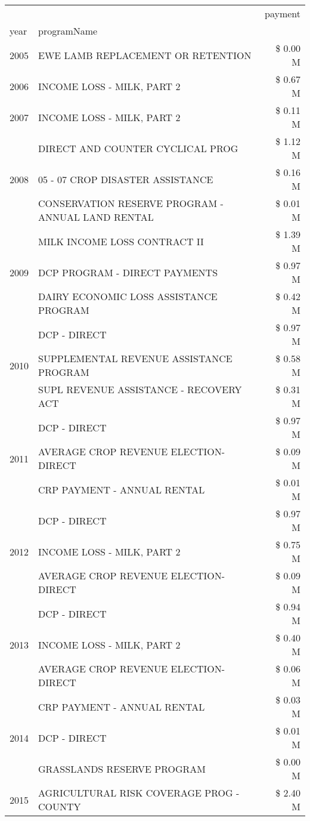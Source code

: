 \begin{tabular}{llr}
\toprule
 &  & payment \\
year & programName &  \\
\midrule
2005 & EWE LAMB REPLACEMENT OR RETENTION & \$ 0.00 M \\
\cline{1-3}
2006 & INCOME LOSS - MILK, PART 2 & \$ 0.67 M \\
\cline{1-3}
2007 & INCOME LOSS - MILK, PART 2 & \$ 0.11 M \\
\cline{1-3}
\multirow[t]{3}{*}{2008} & DIRECT AND COUNTER CYCLICAL PROG & \$ 1.12 M \\
 & 05 - 07 CROP DISASTER ASSISTANCE & \$ 0.16 M \\
 & CONSERVATION RESERVE PROGRAM - ANNUAL LAND RENTAL & \$ 0.01 M \\
\cline{1-3}
\multirow[t]{3}{*}{2009} & MILK INCOME LOSS CONTRACT II & \$ 1.39 M \\
 & DCP PROGRAM - DIRECT PAYMENTS & \$ 0.97 M \\
 & DAIRY ECONOMIC LOSS ASSISTANCE PROGRAM & \$ 0.42 M \\
\cline{1-3}
\multirow[t]{3}{*}{2010} & DCP - DIRECT & \$ 0.97 M \\
 & SUPPLEMENTAL REVENUE ASSISTANCE PROGRAM & \$ 0.58 M \\
 & SUPL REVENUE ASSISTANCE - RECOVERY ACT & \$ 0.31 M \\
\cline{1-3}
\multirow[t]{3}{*}{2011} & DCP - DIRECT & \$ 0.97 M \\
 & AVERAGE CROP REVENUE ELECTION-DIRECT & \$ 0.09 M \\
 & CRP PAYMENT - ANNUAL RENTAL & \$ 0.01 M \\
\cline{1-3}
\multirow[t]{3}{*}{2012} & DCP - DIRECT & \$ 0.97 M \\
 & INCOME LOSS - MILK, PART 2 & \$ 0.75 M \\
 & AVERAGE CROP REVENUE ELECTION-DIRECT & \$ 0.09 M \\
\cline{1-3}
\multirow[t]{3}{*}{2013} & DCP - DIRECT & \$ 0.94 M \\
 & INCOME LOSS - MILK, PART 2 & \$ 0.40 M \\
 & AVERAGE CROP REVENUE ELECTION-DIRECT & \$ 0.06 M \\
\cline{1-3}
\multirow[t]{3}{*}{2014} & CRP PAYMENT - ANNUAL RENTAL & \$ 0.03 M \\
 & DCP - DIRECT & \$ 0.01 M \\
 & GRASSLANDS RESERVE PROGRAM & \$ 0.00 M \\
\cline{1-3}
\multirow[t]{3}{*}{2015} & AGRICULTURAL RISK COVERAGE PROG - COUNTY & \$ 2.40 M \\

\end{tabular}
